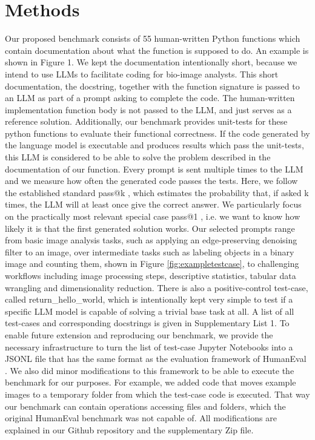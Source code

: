 \documentclass{ecai}
\begin{document}

\section{Methods}

Our proposed benchmark consists of 55 human-written Python functions which contain documentation about what the function is supposed to do. An example is shown in Figure 1. We kept the documentation intentionally short, because we intend to use LLMs to facilitate coding for bio-image analysts. This short documentation, the docstring, together with the function signature is passed to an LLM as part of a prompt asking to complete the code. The human-written implementation function body is not passed to the LLM, and just serves as a reference  solution. Additionally, our benchmark provides unit-tests for these python functions to evaluate their functional correctness. If the code generated by  the language model is executable and produces results which pass the unit-tests, this LLM is considered to be able to solve the problem described in the documentation of our function. Every prompt is sent multiple times to the LLM and we measure how often the generated  code passes the tests. Here, we follow the established standard pass@k \citep{chen2021evaluating}, which estimates the probability that, if asked k times, the LLM will at least once give the correct answer. We particularly focus on the practically most relevant special case pass@1 , i.e. we want to know how likely it is that the first generated solution works.  
Our selected prompts range from basic image analysis tasks, such as applying an edge-preserving denoising filter to an image, over intermediate tasks such as labeling objects in a binary image and counting them, shown in Figure \ref{fig:exampletestcase}, to challenging workflows including image processing steps, descriptive statistics, tabular data wrangling and dimensionality reduction. There is also a positive-control test-case, called return\_hello\_world, which is intentionally kept very simple to test if a specific LLM model is  capable of solving a trivial base task at all. A list of all test-cases and corresponding docstrings is given in Supplementary List 1.
To enable future extension and reproducing our benchmark, we provide the necessary infrastructure to turn the list of test-case Jupyter Notebooks into a JSONL file that has the same format as the evaluation framework of HumanEval \citep{chen2021evaluating}. We also did minor modifications to this framework to be able to execute the benchmark for our purposes. For example, we added code that moves example images to a temporary folder from which the test-case code is executed. That way our benchmark can contain operations accessing files and folders, which the original HumanEval benchmark was not capable of. All modifications are explained in our Github repository and the supplementary Zip file. 
\end{document}
